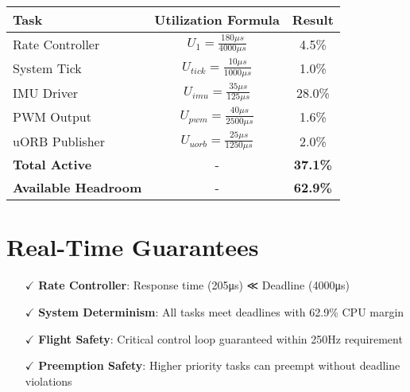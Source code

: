 \documentclass[landscape,a4paper]{article}
\begin{document}
\begin{tcolorbox}[colback=px4green!5,colframe=px4green,width=\textwidth,arc=2mm,boxrule=1.5pt,title=\textbf{CPU Utilization Breakdown},fonttitle=\bfseries]
\begin{center}
\begin{tabular}{|l|c|c|}
\hline
\rowcolor{px4darkblue!20}
\textbf{Task} & \textbf{Utilization Formula} & \textbf{Result} \\
\hline
\rowcolor{ratecontrol!20}
Rate Controller & $U_1 = \frac{180\mu s}{4000\mu s}$ & 4.5\% \\
\hline
\rowcolor{systick!20}
System Tick & $U_{tick} = \frac{10\mu s}{1000\mu s}$ & 1.0\% \\
\hline
\rowcolor{imudriver!20}
IMU Driver & $U_{imu} = \frac{35\mu s}{125\mu s}$ & 28.0\% \\
\hline
\rowcolor{pwmout!20}
PWM Output & $U_{pwm} = \frac{40\mu s}{2500\mu s}$ & 1.6\% \\
\hline
\rowcolor{uorbpub!20}
uORB Publisher & $U_{uorb} = \frac{25\mu s}{1250\mu s}$ & 2.0\% \\
\hline
\rowcolor{px4green!20}
\textbf{Total Active} & - & \textbf{37.1\%} \\
\hline
\rowcolor{px4gray!20}
\textbf{Available Headroom} & - & \textbf{62.9\%} \\
\hline
\end{tabular}
\end{center}
\end{tcolorbox}

\section{Real-Time Guarantees}

\begin{tcolorbox}[colback=px4green!5,colframe=px4green,width=\textwidth,arc=2mm,boxrule=1.5pt,title=\textbf{Schedulability Verification},fonttitle=\bfseries]
\begin{itemize}[leftmargin=1em]
    \item[\color{px4green}$\checkmark$] \textbf{Rate Controller}: Response time (205μs) ≪ Deadline (4000μs)
    \item[\color{px4green}$\checkmark$] \textbf{System Determinism}: All tasks meet deadlines with 62.9\% CPU margin
    \item[\color{px4green}$\checkmark$] \textbf{Flight Safety}: Critical control loop guaranteed within 250Hz requirement
    \item[\color{px4green}$\checkmark$] \textbf{Preemption Safety}: Higher priority tasks can preempt without deadline violations
\end{itemize}
\end{tcolorbox}
\end{document}
